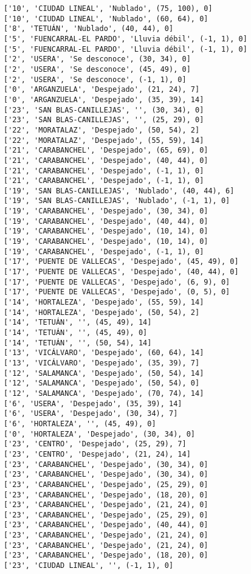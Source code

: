 \documentclass[11pt]{article}
\begin{document}
\begin{Verbatim}[commandchars=\\\{\}]
['10', 'CIUDAD LINEAL', 'Nublado', (75, 100), 0]
['10', 'CIUDAD LINEAL', 'Nublado', (60, 64), 0]
['8', 'TETUÁN', 'Nublado', (40, 44), 0]
['5', 'FUENCARRAL-EL PARDO', 'Lluvia débil', (-1, 1), 0]
['5', 'FUENCARRAL-EL PARDO', 'Lluvia débil', (-1, 1), 0]
['2', 'USERA', 'Se desconoce', (30, 34), 0]
['2', 'USERA', 'Se desconoce', (45, 49), 0]
['2', 'USERA', 'Se desconoce', (-1, 1), 0]
['0', 'ARGANZUELA', 'Despejado', (21, 24), 7]
['0', 'ARGANZUELA', 'Despejado', (35, 39), 14]
['23', 'SAN BLAS-CANILLEJAS', '', (30, 34), 0]
['23', 'SAN BLAS-CANILLEJAS', '', (25, 29), 0]
['22', 'MORATALAZ', 'Despejado', (50, 54), 2]
['22', 'MORATALAZ', 'Despejado', (55, 59), 14]
['21', 'CARABANCHEL', 'Despejado', (65, 69), 0]
['21', 'CARABANCHEL', 'Despejado', (40, 44), 0]
['21', 'CARABANCHEL', 'Despejado', (-1, 1), 0]
['21', 'CARABANCHEL', 'Despejado', (-1, 1), 0]
['19', 'SAN BLAS-CANILLEJAS', 'Nublado', (40, 44), 6]
['19', 'SAN BLAS-CANILLEJAS', 'Nublado', (-1, 1), 0]
['19', 'CARABANCHEL', 'Despejado', (30, 34), 0]
['19', 'CARABANCHEL', 'Despejado', (40, 44), 0]
['19', 'CARABANCHEL', 'Despejado', (10, 14), 0]
['19', 'CARABANCHEL', 'Despejado', (10, 14), 0]
['19', 'CARABANCHEL', 'Despejado', (-1, 1), 0]
['17', 'PUENTE DE VALLECAS', 'Despejado', (45, 49), 0]
['17', 'PUENTE DE VALLECAS', 'Despejado', (40, 44), 0]
['17', 'PUENTE DE VALLECAS', 'Despejado', (6, 9), 0]
['17', 'PUENTE DE VALLECAS', 'Despejado', (0, 5), 0]
['14', 'HORTALEZA', 'Despejado', (55, 59), 14]
['14', 'HORTALEZA', 'Despejado', (50, 54), 2]
['14', 'TETUÁN', '', (45, 49), 14]
['14', 'TETUÁN', '', (45, 49), 0]
['14', 'TETUÁN', '', (50, 54), 14]
['13', 'VICÁLVARO', 'Despejado', (60, 64), 14]
['13', 'VICÁLVARO', 'Despejado', (35, 39), 7]
['12', 'SALAMANCA', 'Despejado', (50, 54), 14]
['12', 'SALAMANCA', 'Despejado', (50, 54), 0]
['12', 'SALAMANCA', 'Despejado', (70, 74), 14]
['6', 'USERA', 'Despejado', (35, 39), 14]
['6', 'USERA', 'Despejado', (30, 34), 7]
['6', 'HORTALEZA', '', (45, 49), 0]
['0', 'HORTALEZA', 'Despejado', (30, 34), 0]
['23', 'CENTRO', 'Despejado', (25, 29), 7]
['23', 'CENTRO', 'Despejado', (21, 24), 14]
['23', 'CARABANCHEL', 'Despejado', (30, 34), 0]
['23', 'CARABANCHEL', 'Despejado', (30, 34), 0]
['23', 'CARABANCHEL', 'Despejado', (25, 29), 0]
['23', 'CARABANCHEL', 'Despejado', (18, 20), 0]
['23', 'CARABANCHEL', 'Despejado', (21, 24), 0]
['23', 'CARABANCHEL', 'Despejado', (25, 29), 0]
['23', 'CARABANCHEL', 'Despejado', (40, 44), 0]
['23', 'CARABANCHEL', 'Despejado', (21, 24), 0]
['23', 'CARABANCHEL', 'Despejado', (21, 24), 0]
['23', 'CARABANCHEL', 'Despejado', (18, 20), 0]
['23', 'CIUDAD LINEAL', '', (-1, 1), 0]

\end{Verbatim}
\end{document}
